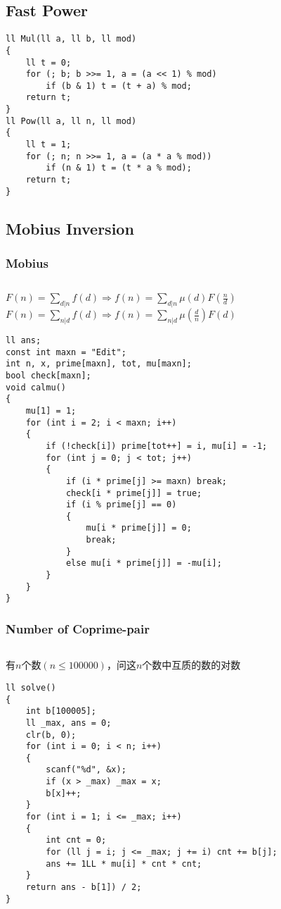 \documentclass[twoside]{article}
\begin{document}
\subsection{Fast Power}
\begin{lstlisting}
ll Mul(ll a, ll b, ll mod)
{
    ll t = 0;
    for (; b; b >>= 1, a = (a << 1) % mod)
        if (b & 1) t = (t + a) % mod;
    return t;
}
ll Pow(ll a, ll n, ll mod)
{
    ll t = 1;
    for (; n; n >>= 1, a = (a * a % mod))
        if (n & 1) t = (t * a % mod);
    return t;
}
\end{lstlisting}
\subsection{Mobius Inversion}
\subsubsection{Mobius}
\begin{lstlisting}
\end{lstlisting}
$F(n)=\sum_{d|n}f(d)\Rightarrow f(n)=\sum_{d|n}\mu(d)F(\frac{n}{d})$\\
$F(n)=\sum_{n|d}f(d)\Rightarrow f(n)=\sum_{n|d}\mu(\frac{d}{n})F(d)$
\begin{lstlisting}
ll ans;
const int maxn = "Edit";
int n, x, prime[maxn], tot, mu[maxn];
bool check[maxn];
void calmu()
{
    mu[1] = 1;
    for (int i = 2; i < maxn; i++)
    {
        if (!check[i]) prime[tot++] = i, mu[i] = -1;
        for (int j = 0; j < tot; j++)
        {
            if (i * prime[j] >= maxn) break;
            check[i * prime[j]] = true;
            if (i % prime[j] == 0)
            {
                mu[i * prime[j]] = 0;
                break;
            }
            else mu[i * prime[j]] = -mu[i];
        }
    }
}
\end{lstlisting}
\subsubsection{Number of Coprime-pair}
\begin{lstlisting}
\end{lstlisting}
有$n$个数$(n \leq 100000)$，问这$n$个数中互质的数的对数
\begin{lstlisting}
ll solve()
{
    int b[100005];
    ll _max, ans = 0;
    clr(b, 0);
    for (int i = 0; i < n; i++)
    {
        scanf("%d", &x);
        if (x > _max) _max = x;
        b[x]++;
    }
    for (int i = 1; i <= _max; i++)
    {
        int cnt = 0;
        for (ll j = i; j <= _max; j += i) cnt += b[j];
        ans += 1LL * mu[i] * cnt * cnt;
    }
    return ans - b[1]) / 2;
}
\end{lstlisting}
\end{document}
